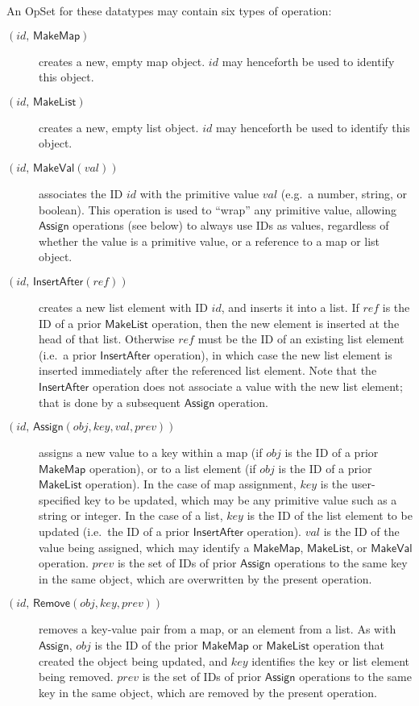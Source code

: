 An OpSet for these datatypes may contain six types of operation:
\begin{description}
    \item[$(\mathit{id},\, \mathsf{MakeMap})$] creates a new, empty map object.
        $\mathit{id}$ may henceforth be used to identify this object.
    \item[$(\mathit{id},\, \mathsf{MakeList})$] creates a new, empty list object.
        $\mathit{id}$ may henceforth be used to identify this object.
    \item[$(\mathit{id},\, \mathsf{MakeVal}(\mathit{val}))$] associates the ID $\mathit{id}$ with the primitive value $\mathit{val}$ (e.g.\ a number, string, or boolean).
        This operation is used to ``wrap'' any primitive value, allowing $\mathsf{Assign}$ operations (see below) to always use IDs as values, regardless of whether the value is a primitive value, or a reference to a map or list object.
    \item[$(\mathit{id},\, \mathsf{InsertAfter}(\mathit{ref}))$] creates a new list element with ID $\mathit{id}$, and inserts it into a list.
        If $\mathit{ref}$ is the ID of a prior $\mathsf{MakeList}$ operation, then the new element is inserted at the head of that list.
        Otherwise $\mathit{ref}$ must be the ID of an existing list element (i.e.\ a prior $\mathsf{InsertAfter}$ operation), in which case the new list element is inserted immediately after the referenced list element.
        Note that the $\mathsf{InsertAfter}$ operation does not associate a value with the new list element; that is done by a subsequent $\mathsf{Assign}$ operation.
    \item[$(\mathit{id},\, \mathsf{Assign}(\mathit{obj}, \mathit{key}, \mathit{val}, \mathit{prev}))$] assigns a new value to a key within a map (if $\mathit{obj}$ is the ID of a prior $\mathsf{MakeMap}$ operation), or to a list element (if $\mathit{obj}$ is the ID of a prior $\mathsf{MakeList}$ operation).
        In the case of map assignment, $\mathit{key}$ is the user-specified key to be updated, which may be any primitive value such as a string or integer.
        In the case of a list, $\mathit{key}$ is the ID of the list element to be updated (i.e.\ the ID of a prior $\mathsf{InsertAfter}$ operation).
        $\mathit{val}$ is the ID of the value being assigned, which may identify a $\mathsf{MakeMap}$, $\mathsf{MakeList}$, or $\mathsf{MakeVal}$ operation.
        $\mathit{prev}$ is the set of IDs of prior $\mathsf{Assign}$ operations to the same key in the same object, which are overwritten by the present operation.
    \item[$(\mathit{id},\, \mathsf{Remove}(\mathit{obj}, \mathit{key}, \mathit{prev}))$] removes a key-value pair from a map, or an element from a list.
        As with $\mathsf{Assign}$, $\mathit{obj}$ is the ID of the prior $\mathsf{MakeMap}$ or $\mathsf{MakeList}$ operation that created the object being updated, and $\mathit{key}$ identifies the key or list element being removed.
        $\mathit{prev}$ is the set of IDs of prior $\mathsf{Assign}$ operations to the same key in the same object, which are removed by the present operation.
\end{description}

